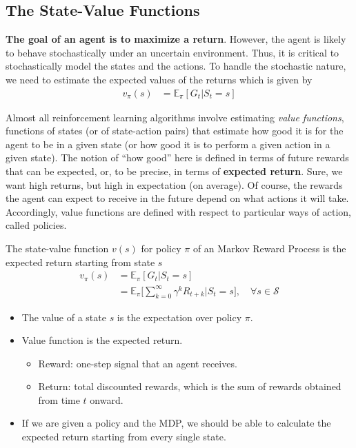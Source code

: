 \subsection{The State-Value Functions}

\textbf{The goal of an agent is to maximize a return}. However, the agent is likely to behave stochastically under an uncertain environment. Thus, it is critical to stochastically model the states and the actions. To handle the stochastic nature, we need to estimate the expected values of the returns which is given by
\begin{align*}
	v_{\pi}(s) &= \mathbb{E}_\pi[G_t|S_t=s]
\end{align*}

Almost all reinforcement learning algorithms involve estimating \textit{value functions}, functions of states (or of state-action pairs) that estimate how good it is for the agent to be in a given state (or how good it is to perform a given action in a given state). The notion of ``how good'' here is defined in terms of future rewards that can be expected, or, to be precise, in terms of \textbf{expected return}. Sure, we want high returns, but high in expectation (on average). Of course, the rewards the agent can expect to receive in the future depend on what actions it will take. Accordingly, value functions are defined with respect to particular ways of action, called policies. 

\begin{definition}
	The state-value function $v(s)$ for policy $\pi$ of an Markov Reward Process is the expected return starting from state $s$
	\begin{align*}
		v_{\pi}(s) &= \mathbb{E}_\pi[G_t|S_t=s]\\
				   &= \mathbb{E}_\pi \Bigg[\sum_{k=0}^\infty \gamma^kR_{t+k}\Big|S_t=s\Bigg], \quad \forall s\in \mathcal{S}
	\end{align*}
	$$$$
\end{definition}

\begin{itemize}
	\item The value of a state $s$ is the expectation over policy $\pi$.
	\item Value function is the expected return. 
		\begin{itemize}
			\item Reward: one-step signal that an agent receives.
			\item Return: total discounted rewards, which is the sum of rewards obtained from time $t$ onward.
		\end{itemize}
	\item If we are given a policy and the MDP, we should be able to calculate the expected return starting from every single state. 
\end{itemize}

